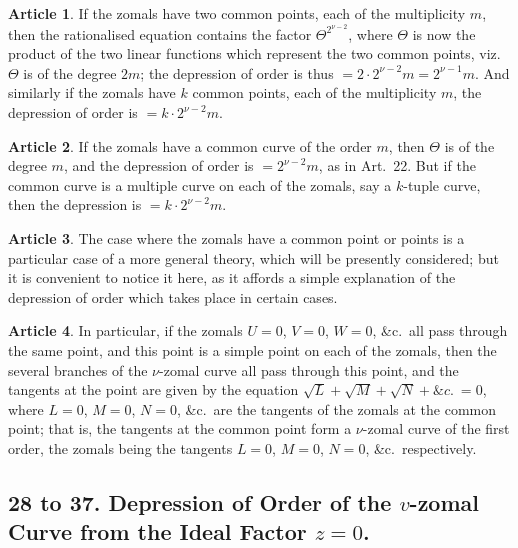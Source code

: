 \documentclass[11pt,a4paper]{article}
\theoremstyle{definition}
\newtheorem{art}{Article}
\begin{document}
\begin{art}
If the zomals have two common points, each of the multiplicity $m$, then the rationalised equation contains the factor $\Theta^{2^{\nu-2}}$, where $\Theta$ is now the product of the two linear functions which represent the two common points, viz.\ $\Theta$ is of the degree $2m$; the depression of order is thus $= 2 \cdot 2^{\nu-2}m = 2^{\nu-1}m$. And similarly if the zomals have $k$ common points, each of the multiplicity $m$, the depression of order is $= k \cdot 2^{\nu-2}m$.
\end{art}

\begin{art}
If the zomals have a common curve of the order $m$, then $\Theta$ is of the degree $m$, and the depression of order is $= 2^{\nu-2}m$, as in Art.\ 22. But if the common curve is a multiple curve on each of the zomals, say a $k$-tuple curve, then the depression is $= k \cdot 2^{\nu-2}m$.
\end{art}

\begin{art}
The case where the zomals have a common point or points is a particular case of a more general theory, which will be presently considered; but it is convenient to notice it here, as it affords a simple explanation of the depression of order which takes place in certain cases.
\end{art}

\begin{art}
In particular, if the zomals $U = 0$, $V = 0$, $W = 0$, \&c.\ all pass through the same point, and this point is a simple point on each of the zomals, then the several branches of the $\nu$-zomal curve all pass through this point, and the tangents at the point are given by the equation $\sqrt{L} + \sqrt{M} + \sqrt{N} + \&c.\ = 0$, where $L = 0$, $M = 0$, $N = 0$, \&c.\ are the tangents of the zomals at the common point; that is, the tangents at the common point form a $\nu$-zomal curve of the first order, the zomals being the tangents $L = 0$, $M = 0$, $N = 0$, \&c.\ respectively.
\end{art}

\subsection{28 to 37. Depression of Order of the $v$-zomal Curve from the Ideal Factor $z = 0$.}
\end{document}
